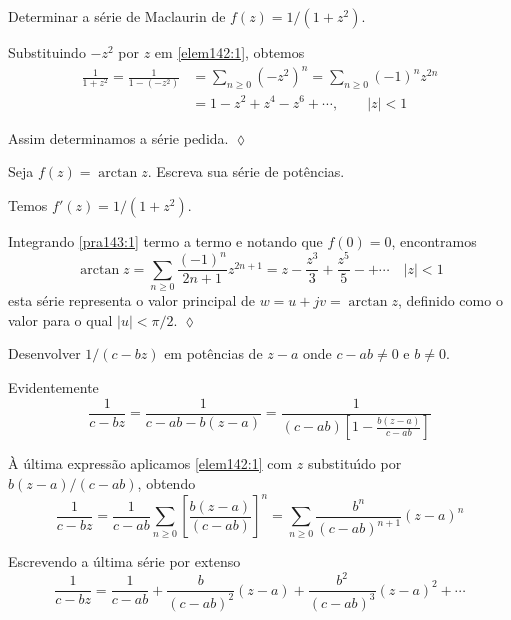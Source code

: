 \begin{exer}[Substitui\c{c}\~{a}o]
Determinar a s\'{e}rie de Maclaurin de $f(z)=1/(1 + z^2)$.
\end{exer}

\solo Substituindo $-z^2$ por $z$ em \eqref{elem142:1}, obtemos
\begin{align}\label{pra143:1}
  \frac{1}{1+z^2}=\frac{1}{1-(-z^2)} &= \sum_{n\geq 0}(-z^2)^n=\sum_{n\geq 0}(-1)^nz^{2n}\\[2ex]
  &=1-z^2+z^4-z^6+\cdots,\qquad |z|<1\nonumber
\end{align}

Assim determinamos a s\'{e}rie pedida. \hfill \(\lozenge\)

\begin{exer}[Integra\c{c}\~{a}o] Seja $f(z)= \arctan z$. Escreva sua s\'{e}rie
de pot\^{e}ncias.
\end{exer}

\solo Temos $f'(z)= 1/(1 + z^2)$.

Integrando \eqref{pra143:1} termo a termo e notando que $f(0)= 0$,
encontramos
\begin{equation*}
\arctan z=\sum_{n\geq
0}\frac{(-1)^n}{2n+1}z^{2n+1}=z-\frac{z^3}{3}+\frac{z^5}{5}-+\cdots
\quad |z|<1
\end{equation*}
esta s\'{e}rie representa o valor principal de $w = u + jv = \arctan
z$, definido como o valor para o qual $|u|<\pi/2$. \hfill \(\lozenge\)


\begin{exer} Desenvolver
$1/(c - bz)$ em pot\^{e}ncias de $z - a$ onde $c - ab \neq 0$ e $b
\neq 0$.
\end{exer}

\solo Evidentemente
\begin{equation*}
\frac{1}{c - bz} = \frac{1}{c-ab-b(z - a)} = \frac{1}{(c -
ab)\left[1- \frac{b(z - a)}{c - ab}\right]}
\end{equation*}

\`{A} \'{u}ltima express\~{a}o aplicamos \eqref{elem142:1} com $z$ substitu\'{\i}do
por $b(z - a)/(c - ab)$, obtendo
\begin{equation*}
\frac{1}{c- bz}=\frac{1}{c-ab}\sum_{n\geq
0}\left[\frac{b(z-a)}{(c-ab)}\right]^n=\sum_{n\geq
0}\frac{b^n}{(c-ab)^{n+1}}(z-a)^n
\end{equation*}

Escrevendo a \'{u}ltima s\'{e}rie por extenso
\begin{equation*}
\frac{1}{c- bz}= \frac{1}{c - ab}+ \frac{b}{(c - ab)^2}(z - a)+
 \frac{b^2}{(c-ab)^3}(z - a)^2+\cdots
\end{equation*}

